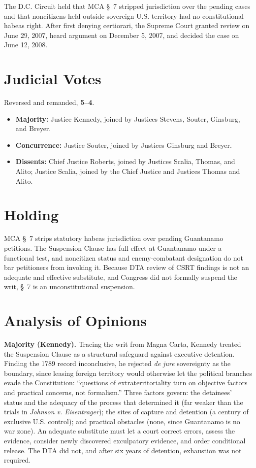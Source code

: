 \documentclass[12pt]{article}
\begin{document}
The D.C. Circuit held that MCA \S~7 stripped jurisdiction over the pending cases and that noncitizens held outside sovereign U.S. territory had no constitutional habeas right. After first denying certiorari, the Supreme Court granted review on June 29, 2007, heard argument on December 5, 2007, and decided the case on June 12, 2008.

\section{Judicial Votes}

Reversed and remanded, \textbf{5--4}.
\begin{itemize}
\item \textbf{Majority:} Justice Kennedy, joined by Justices Stevens, Souter, Ginsburg, and Breyer.
\item \textbf{Concurrence:} Justice Souter, joined by Justices Ginsburg and Breyer.
\item \textbf{Dissents:} Chief Justice Roberts, joined by Justices Scalia, Thomas, and Alito; Justice Scalia, joined by the Chief Justice and Justices Thomas and Alito.
\end{itemize}

\section{Holding}

MCA \S~7 strips statutory habeas jurisdiction over pending Guantanamo petitions. The Suspension Clause has full effect at Guantanamo under a functional test, and noncitizen status and enemy-combatant designation do not bar petitioners from invoking it. Because DTA review of CSRT findings is not an adequate and effective substitute, and Congress did not formally suspend the writ, \S~7 is an unconstitutional suspension.

\section{Analysis of Opinions}

\textbf{Majority (Kennedy).} Tracing the writ from Magna Carta, Kennedy treated the Suspension Clause as a structural safeguard against executive detention. Finding the 1789 record inconclusive, he rejected \textit{de jure} sovereignty as the boundary, since leasing foreign territory would otherwise let the political branches evade the Constitution: ``questions of extraterritoriality turn on objective factors and practical concerns, not formalism.'' Three factors govern: the detainees' status and the adequacy of the process that determined it (far weaker than the trials in \textit{Johnson v. Eisentrager}); the sites of capture and detention (a century of exclusive U.S. control); and practical obstacles (none, since Guantanamo is no war zone). An adequate substitute must let a court correct errors, assess the evidence, consider newly discovered exculpatory evidence, and order conditional release. The DTA did not, and after six years of detention, exhaustion was not required.
\end{document}

